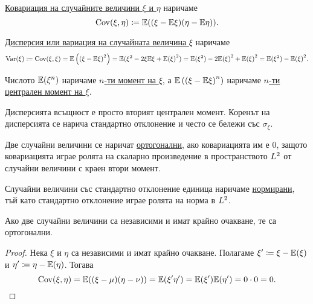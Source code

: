 \documentclass[numbers=endperiod, DIV=15, bibliography=totocnumbered]{scrartcl}
\begin{document}
\begin{definition}
  \underline{Ковариация на случайните величини $\xi$ и $\eta$} наричаме
  \begin{displaymath}
    \operatorname{Cov}(\xi, \eta)
    \coloneqq
    \mathbb{E}((\xi - \mathbb{E} \xi) (\eta - \mathbb{E} \eta)).
  \end{displaymath}

  \underline{Дисперсия или вариация на случайната величина $\xi$} наричаме
  \begin{displaymath}
    \operatorname{Var}(\xi)
    \coloneqq
    \operatorname{Cov}(\xi, \xi)
    =
    \mathbb{E} \left({(\xi - \mathbb{E} \xi)}^2 \right)
    =
    \mathbb{E}(\xi^2 - 2 \xi \mathbb{E} \xi + {\mathbb{E}(\xi)}^2)
    =
    \mathbb{E}(\xi^2) - 2 {\mathbb{E}(\xi)}^2 + {\mathbb{E}(\xi)}^2
    =
    \mathbb{E}(\xi^2) - {\mathbb{E}(\xi)}^2.
  \end{displaymath}

  Числото $\mathbb{E}(\xi^n)$ наричаме \underline{$n$-ти момент на $\xi$}, а $\mathbb{E} \left( {(\xi - \mathbb{E} \xi)}^n \right)$ наричаме \underline{$n$-ти централен момент на $\xi$}.

  Дисперсията всъщност е просто вторият централен момент. Коренът на дисперсията се нарича стандартно отклонение и често се бележи със $\sigma_\xi$.

  Две случайни величини се наричат \underline{ортогонални}, ако ковариацията им е $0$, защото ковариацията играе ролята на скаларно произведение в пространството $L^2$ от случайни величини с краен втори момент.

  Случайни величини със стандартно отклонение единица наричаме \underline{нормирани}, тъй като стандартно отклонение играе ролята на норма в $L^2$.
\end{definition}

\begin{proposition}\label{thm:orthogonal-independent}
  Ако две случайни величини са независими и имат крайно очакване, те са ортогонални.
\end{proposition}
\begin{proof}
  Нека $\xi$ и $\eta$ са независими и имат крайно очакване. Полагаме $\xi' \coloneqq \xi - \mathbb{E}(\xi)$ и $\eta' \coloneqq \eta - \mathbb{E}(\eta)$. Тогава
  \begin{displaymath}
    \operatorname{Cov}(\xi, \eta)
    =
    \mathbb{E}((\xi - \mu) (\eta - \nu))
    =
    \mathbb{E}(\xi' \eta')
    =
    \mathbb{E}(\xi') \mathbb{E}(\eta')
    =
    0 \cdot 0
    =
    0.
  \end{displaymath}
\end{proof}
\end{document}
